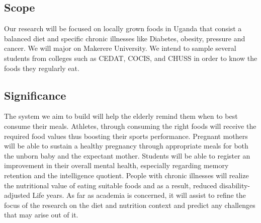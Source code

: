\documentclass{article}
\begin{document}
\subsection{Scope}
Our research will be focused on locally grown foods in Uganda that consist a balanced diet and specific chronic illnesses like Diabetes, obesity, pressure and cancer. We will major on Makerere University. We intend to sample several students from colleges such as CEDAT, COCIS, and CHUSS in order to know the foods they regularly eat.

\subsection{Significance}
The system we aim to build will help the elderly remind them when to best consume their meals. Athletes, through consuming the right foods will receive the required food values thus boosting their sports performance. Pregnant mothers will be able to sustain a healthy pregnancy through appropriate meals for both the unborn baby and the expectant mother. Students will be able to register an improvement in their overall mental health, especially regarding memory retention and the intelligence quotient.  People with chronic illnesses will realize the nutritional value of eating suitable foods and as a result, reduced disability-adjusted Life years. As far as academia is concerned, it will assist to refine the focus of the research on the diet and nutrition context and predict any challenges that may arise out of it.


\end{document}
